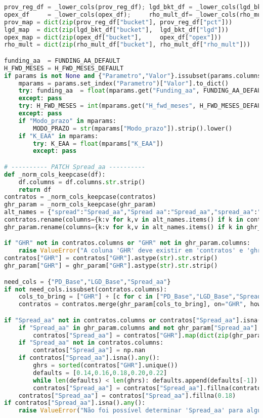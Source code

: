 \documentclass[11pt,a4paper]{article}
\newcommand{\1}{\mathbf{1}}
\begin{document}
\begin{lstlisting}[language=Python, caption={risk_frontier.py}]
prov_reg_df = _lower_cols(prov_reg_df); lgd_bkt_df = _lower_cols(lgd_bkt_df)
opex_df     = _lower_cols(opex_df);     rho_mult_df= _lower_cols(rho_mult_df)
prov_map = dict(zip(prov_reg_df["bucket"], prov_reg_df["pct"]))
lgd_map  = dict(zip(lgd_bkt_df["bucket"],  lgd_bkt_df["lgd"]))
opex_map = dict(zip(opex_df["bucket"],     opex_df["opex"]))
rho_mult = dict(zip(rho_mult_df["bucket"], rho_mult_df["rho_mult"]))

funding_aa  = FUNDING_AA_DEFAULT
H_FWD_MESES = H_FWD_MESES_DEFAULT
if params is not None and {"Parametro","Valor"}.issubset(params.columns):
    mparams = params.set_index("Parametro")["Valor"].to_dict()
    try: funding_aa  = float(mparams.get("Funding_aa", FUNDING_AA_DEFAULT))
    except: pass
    try: H_FWD_MESES = int(mparams.get("H_fwd_meses", H_FWD_MESES_DEFAULT))
    except: pass
    if "Modo_prazo" in mparams:
        MODO_PRAZO = str(mparams["Modo_prazo"]).strip().lower()
    if "K_EAA" in mparams:
        try: K_EAA = float(mparams["K_EAA"])
        except: pass

# ---------- PATCH Spread_aa ----------
def _norm_cols_keepcase(df):
    df.columns = df.columns.str.strip()
    return df
contratos = _norm_cols_keepcase(contratos)
ghr_param = _norm_cols_keepcase(ghr_param)
alt_names = {"spread":"Spread_aa","Spread aa":"Spread_aa","spread_aa":"Spread_aa","SPREAD_AA":"Spread_aa"}
contratos.rename(columns={k:v for k,v in alt_names.items() if k in contratos.columns}, inplace=True)
ghr_param.rename(columns={k:v for k,v in alt_names.items() if k in ghr_param.columns}, inplace=True)

if "GHR" not in contratos.columns or "GHR" not in ghr_param.columns:
    raise ValueError("A coluna 'GHR' deve existir em 'contratos' e 'ghr_param'.")
contratos["GHR"] = contratos["GHR"].astype(str).str.strip()
ghr_param["GHR"] = ghr_param["GHR"].astype(str).str.strip()

need_cols = {"PD_Base","LGD_Base","Spread_aa"}
if not need_cols.issubset(contratos.columns):
    cols_to_bring = ["GHR"] + [c for c in ["PD_Base","LGD_Base","Spread_aa"] if c in ghr_param.columns]
    contratos = contratos.merge(ghr_param[cols_to_bring], on="GHR", how="left", validate="many_to_one")

if "Spread_aa" not in contratos.columns or contratos["Spread_aa"].isna().all():
    if "Spread_aa" in ghr_param.columns and not ghr_param["Spread_aa"].isna().all():
        contratos["Spread_aa"] = contratos["GHR"].map(dict(zip(ghr_param["GHR"], ghr_param["Spread_aa"])))
    if "Spread_aa" not in contratos.columns:
        contratos["Spread_aa"] = np.nan
    if contratos["Spread_aa"].isna().any():
        ghrs = sorted(contratos["GHR"].unique())
        defaults = [0.14,0.16,0.18,0.20,0.22]
        while len(defaults) < len(ghrs): defaults.append(defaults[-1])
        contratos["Spread_aa"] = contratos["Spread_aa"].fillna(contratos["GHR"].map({g:s for g,s in zip(ghrs, defaults)}))
    contratos["Spread_aa"] = contratos["Spread_aa"].fillna(0.18)
if contratos["Spread_aa"].isna().any():
    raise ValueError("Não foi possível determinar 'Spread_aa' para alguns contratos.")


\end{lstlisting}
\end{document}
